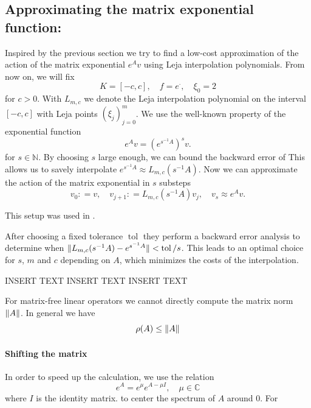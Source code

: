 \documentclass{scrartcl}
\newcommand{\defneq}{\mathrel{\mathop:}=}
\begin{document}
\subsection{Approximating the matrix exponential function:}
Inspired by the previous section we try to find a low-cost approximation of the action of the matrix exponential $e^Av$ using Leja interpolation polynomials. From now on, we will fix 
\[K=[-c,c], \quad f = e^\cdot, \quad \xi_0 = 2 \]
for $c>0$. With $L_{m,c}$ we denote the Leja interpolation polynomial on the interval $[-c,c]$ with Leja points $(\xi_j)_{j=0}^{m}$. We use the well-known property of the exponential function
\[e^Av = (e^{s^{-1}A})^sv.\]
for $s\in\mathbb{N}$. By choosing $s$ large enough, we can bound the backward error of  This allows us to savely interpolate $e^{s^{-1}A} \approx L_{m,c}(s^{-1}A)$. Now we can approximate the action of the matrix exponential in $s$ substeps
\[v_0\defneq v,\quad v_{j+1}\defneq L_{m,c}(s^{-1}A)v_j,\quad v_s \approx e^Av.\]



This setup was used in \cite{lejarev}.

After choosing a fixed tolerance $\operatorname{tol}$ they perform a backward error analysis to determine when $\lVert L_{m,c}(s^{-1}A) - e^{s^{-1}A}\rVert < \operatorname{tol}/s$. This leads to an optimal choice for $s$, $m$ and $c$ depending on $A$, which minimizes the costs of the interpolation.

INSERT TEXT INSERT TEXT INSERT TEXT

For matrix-free linear operators we cannot directly compute the matrix norm $\lVert A\rVert$. 
In general we have
\[\rho(A) \le \lVert A\rVert\]


\paragraph{Shifting the matrix}
In order to speed up the calculation, we use the relation
\[ e^{A} = e^{\mu}e^{A-\mu I}, \quad\mu\in\mathbb{C} \]
where $I$ is the identity matrix. to center the spectrum of $A$ around $0$. For 
\end{document}
